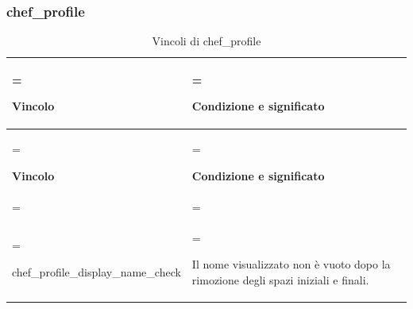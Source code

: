 \documentclass[11pt,a4paper]{article}
\begin{document}
\subsubsection{chef\_profile}
{\small\renewcommand{\arraystretch}{1.25}
\begin{xltabular}{\linewidth}{>{\hsize\linewidth=\hsize\raggedright\arraybackslash}X>{\hsize\linewidth=\hsize\raggedright\arraybackslash}X}
\caption{Vincoli di chef\_profile}\label{tab:dictionary-32}\\
\toprule
\textbf{Vincolo} & \textbf{Condizione e significato}\\\midrule\endfirsthead\toprule\textbf{Vincolo} & \textbf{Condizione e significato}\\\midrule\endhead
\midrule{}\\\endfoot\bottomrule\endlastfoot

{\ttfamily\small chef\_\allowbreak{}profile\_\allowbreak{}display\_\allowbreak{}name\_\allowbreak{}check} & Il nome visualizzato non è vuoto dopo la rimozione degli spazi iniziali e finali.\\*
\end{xltabular}}

\end{document}
